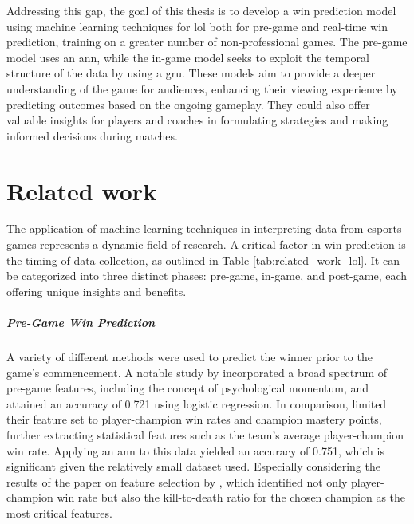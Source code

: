 \documentclass[12pt, a4paper, headinclude, twoside, plainheadsepline, open=right, numbers=noenddot, hidelinks, toc=listof, toc=bibliography]{scrreprt}
\begin{document}
Addressing this gap, the goal of this thesis is to develop a win prediction model using machine learning techniques for \acl{lol} both for pre-game and real-time win prediction, training on a greater number of non-professional games.
The pre-game model uses an \acl{ann}, while the in-game model seeks to exploit the temporal structure of the data by using a \acl{gru}.
These models aim to provide a deeper understanding of the game for audiences, enhancing their viewing experience by predicting outcomes based on the ongoing gameplay. 
They could also offer valuable insights for players and coaches in formulating strategies and making informed decisions during matches.

\chapter{Related work}
\label{chap:related}

The application of machine learning techniques in interpreting data from esports games represents a dynamic field of research. 
A critical factor in win prediction is the timing of data collection, as outlined in Table \ref{tab:related_work_lol}.
It can be categorized into three distinct phases: pre-game, in-game, and post-game, each offering unique insights and benefits.

\paragraph{Pre-Game Win Prediction}
A variety of different methods were used to predict the winner prior to the game's commencement.
A notable study by \citeauthor{whiteScalablePsychologicalMomentum2020} \cite{whiteScalablePsychologicalMomentum2020} incorporated a broad spectrum of pre-game features, including the concept of psychological momentum, and attained an accuracy of 0.721 using logistic regression.
In comparison, \citeauthor{doUsingMachineLearning2021} \cite{doUsingMachineLearning2021} 
limited their feature set to player-champion win rates and champion mastery points, further extracting statistical features such as the team's average player-champion win rate.
Applying an \ac{ann} to this data yielded an accuracy of 0.751, which is significant given the relatively small dataset used. 
Especially considering the results of the paper on feature selection by  \citeauthor{costaFeatureAnalysisLeague2021} \cite{costaFeatureAnalysisLeague2021}, which identified not only player-champion win rate but also the kill-to-death ratio for the chosen champion as the most critical features.
\end{document}
